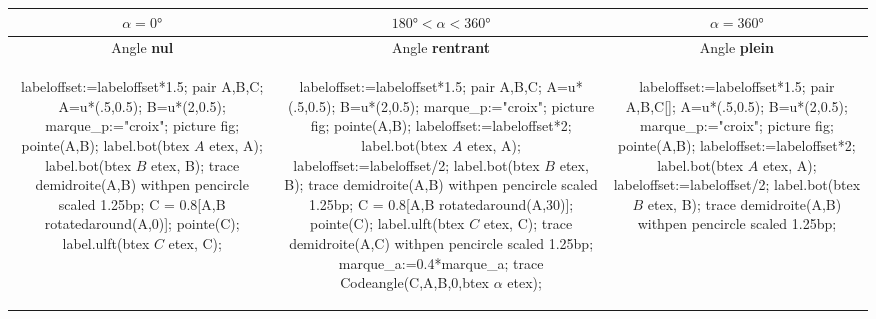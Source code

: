 \begin{changemargin}{0mm}{-15mm}
\begin{definition}[Classement des angles selon leur mesure $\alpha=\widehat{BAC}$]
    \smallskip
    {\renewcommand{\arraystretch}{1.5}
    \begin{tabular}{|*3{c|}}
        \hline
        $\alpha=\ang{0}$ & $\ang{180}<\alpha<\ang{360}$ & $\alpha=\ang{360}$ \\\hline
        Angle \textbf{nul} & Angle \textbf{rentrant} & Angle \textbf{plein} \\\hline
        \begin{Geometrie}[CoinHD={(2.5u,2u)}]            
            labeloffset:=labeloffset*1.5;
            pair A,B,C;
            A=u*(.5,0.5);
            B=u*(2,0.5);
            marque_p:="croix";
            picture fig;
            pointe(A,B);
            label.bot(btex $A$ etex, A);
            label.bot(btex $B$ etex, B);
            trace demidroite(A,B) withpen pencircle scaled 1.25bp;
            C = 0.8[A,B rotatedaround(A,0)];
            pointe(C);
            label.ulft(btex $C$ etex, C);
        \end{Geometrie}
        &
        \begin{Geometrie}[CoinBG={(-u,-0.5u)},CoinHD={(2.5u,1.5u)}]
            labeloffset:=labeloffset*1.5;
            pair A,B,C;
            A=u*(.5,0.5);
            B=u*(2,0.5);
            marque_p:="croix";
            picture fig;
            pointe(A,B);
            labeloffset:=labeloffset*2;
            label.bot(btex $A$ etex, A);
            labeloffset:=labeloffset/2;
            label.bot(btex $B$ etex, B);
            trace demidroite(A,B) withpen pencircle scaled 1.25bp;
            C = 0.8[A,B rotatedaround(A,30)];
            pointe(C);
            label.ulft(btex $C$ etex, C);
            trace demidroite(A,C) withpen pencircle scaled 1.25bp;
            marque_a:=0.4*marque_a;
            trace Codeangle(C,A,B,0,btex $\alpha$ etex);
        \end{Geometrie}
        &
        \begin{Geometrie}[CoinBG={(-u,-0.5u)},CoinHD={(2.5u,1.5u)}]            
            labeloffset:=labeloffset*1.5;
            pair A,B,C[];
            A=u*(.5,0.5);
            B=u*(2,0.5);
            marque_p:="croix";
            picture fig;
            pointe(A,B);
            labeloffset:=labeloffset*2;
            label.bot(btex $A$ etex, A);
            labeloffset:=labeloffset/2;
            label.bot(btex $B$ etex, B);
            trace demidroite(A,B) withpen pencircle scaled 1.25bp;

\end{Geometrie}
\end{tabular}}
\end{definition}
\end{changemargin}
